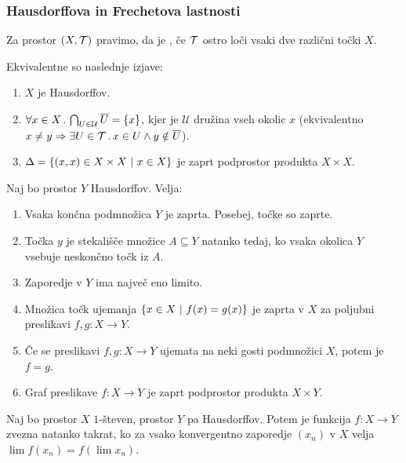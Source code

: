 \subsubsection{Hausdorffova in Frechetova lastnosti}
\begin{definicija}
    Za prostor $(X, \mathcal{T})$ pravimo, da je , če $\mathcal{T}$ ostro loči vsaki dve različni točki $X$.
\end{definicija}

\begin{trditev}
    Ekvivalentne so naslednje izjave:
    \begin{enumerate}
        \item $X$ je Hausdorffov.
        \item $\forall x \in X \,.\, \bigcap_{U \in \mathcal{U}} \overline{U} = \left\{x\right\}$, kjer je $\mathcal{U}$ družina vseh okolic $x$ (ekvivalentno $x \neq y \Rightarrow \exists U \in \mathcal{T} \,.\, x \in U \land y \notin \overline{U}$).
        \item {} $\Delta = \left\{(x,x) \in X \times X \ | \ x \in X\right\}$ je zaprt podprostor produkta $X \times X$.
    \end{enumerate}
\end{trditev}

\begin{izrek}
    Naj bo prostor $Y$ Hausdorffov. Velja:
    \begin{enumerate}
        \item Vsaka končna podmnožica $Y$ je zaprta. Posebej, točke so zaprte.
        \item Točka $y$ je stekališče množice $A \subseteq Y$ natanko tedaj, ko vsaka okolica $Y$ vsebuje neskončno točk iz $A$.
        \item Zaporedje v $Y$ ima največ eno limito.
        \item Množica točk ujemanja $\left\{x \in X \ | \ f(x) = g(x)\right\}$ je zaprta v $X$ za poljubni preslikavi $f, g: X \to Y$.
        \item Če se preslikavi $f, g: X \to Y$ ujemata na neki gosti podmnožici $X$, potem je $f = g$.
        \item Graf preslikave $f: X \to Y$ je zaprt podprostor produkta $X \times Y$.
    \end{enumerate}
\end{izrek}

\begin{izrek}
    Naj bo prostor $X$ $1$-števen, prostor $Y$ pa Hausdorffov. Potem je funkcija $f: X \to Y$ zvezna natanko takrat, ko za vsako konvergentno zaporedje $(x_n)$ v $X$ velja $\lim f(x_n) = f(\lim x_n)$.
\end{izrek}

